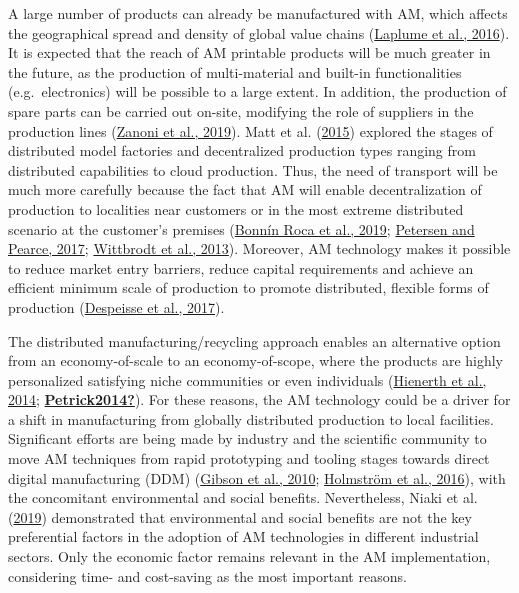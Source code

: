 \documentclass[
  11pt,
]{article}
\begin{document}
A large number of products can already be manufactured with AM, which
affects the geographical spread and density of global value chains
(\protect\hyperlink{ref-Laplume2016}{Laplume et al., 2016}). It is
expected that the reach of AM printable products will be much greater in
the future, as the production of multi-material and built-in
functionalities (e.g.~electronics) will be possible to a large extent.
In addition, the production of spare parts can be carried out on-site,
modifying the role of suppliers in the production lines
(\protect\hyperlink{ref-Zanoni2019}{Zanoni et al., 2019}). Matt et al.
(\protect\hyperlink{ref-Matt2015}{2015}) explored the stages of
distributed model factories and decentralized production types ranging
from distributed capabilities to cloud production. Thus, the need of
transport will be much more carefully because the fact that AM will
enable decentralization of production to localities near customers or in
the most extreme distributed scenario at the customer's premises
(\protect\hyperlink{ref-BonninRoca2019}{Bonnín Roca et al., 2019};
\protect\hyperlink{ref-Petersen2017a}{Petersen and Pearce, 2017};
\protect\hyperlink{ref-Wittbrodt2013}{Wittbrodt et al., 2013}).
Moreover, AM technology makes it possible to reduce market entry
barriers, reduce capital requirements and achieve an efficient minimum
scale of production to promote distributed, flexible forms of production
(\protect\hyperlink{ref-Despeisse2016}{Despeisse et al., 2017}).

The distributed manufacturing/recycling approach enables an alternative
option from an economy-of-scale to an economy-of-scope, where the
products are highly personalized satisfying niche communities or even
individuals (\protect\hyperlink{ref-Hienerth2014}{Hienerth et al.,
2014}; \protect\hyperlink{ref-Petrick2014}{\textbf{Petrick2014?}}). For
these reasons, the AM technology could be a driver for a shift in
manufacturing from globally distributed production to local facilities.
Significant efforts are being made by industry and the scientific
community to move AM techniques from rapid prototyping and tooling
stages towards direct digital manufacturing (DDM)
(\protect\hyperlink{ref-Mueller2012}{Gibson et al., 2010};
\protect\hyperlink{ref-Holmstrom2016}{Holmström et al., 2016}), with the
concomitant environmental and social benefits. Nevertheless, Niaki et
al. (\protect\hyperlink{ref-Niaki2019}{2019}) demonstrated that
environmental and social benefits are not the key preferential factors
in the adoption of AM technologies in different industrial sectors. Only
the economic factor remains relevant in the AM implementation,
considering time- and cost-saving as the most important reasons.
\end{document}
